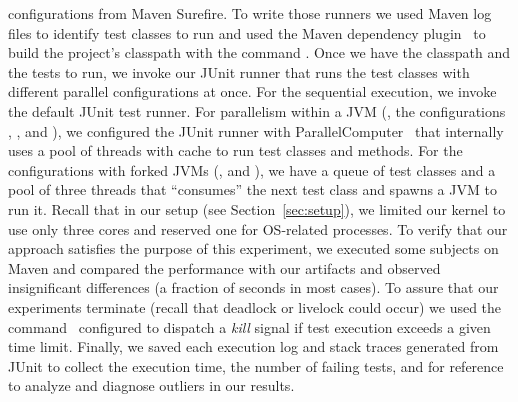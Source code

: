 configurations from Maven Surefire.  To write those runners we used
Maven log files to identify test classes to run and used the Maven
dependency plugin~\cite{maven-dep} to build the project's classpath
with the command . Once we have
the classpath and the tests to run, we invoke our JUnit runner that
runs the test classes with different parallel configurations at
once. For the sequential execution, we invoke the default JUnit test
runner. For parallelism within a JVM (\ie, the configurations
\SeqClassParMeth{}, \ParClassSeqMeth{}, and \ParClassParMeth{}), we
configured the JUnit runner with
ParallelComputer~\cite{junit-parallel} that internally uses a pool of
threads with cache to run test classes and methods. For the
configurations with forked JVMs (\ie, \ForkSeq{} and \ForkParMeth{}),
we have a queue of test classes and a pool of three threads that
``consumes'' the next test class and spawns a JVM to run it.  Recall
that in our setup (see Section~\ref{sec:setup}), we limited our kernel
to use only three cores and reserved one for OS-related processes.  To
verify that our approach satisfies the purpose of this experiment, we
executed some subjects on Maven and compared the performance with our
artifacts and observed insignificant differences (a fraction of
seconds in most cases).  To assure that our experiments terminate
(recall that deadlock or livelock could occur) we used the
 command~\cite{timeout-cmd} configured to dispatch a
\emph{kill} signal if test execution exceeds a given time
limit. Finally, we saved each execution log and stack traces generated
from JUnit to collect the execution time, the number of failing tests,
and for reference to analyze and diagnose outliers in our results.
